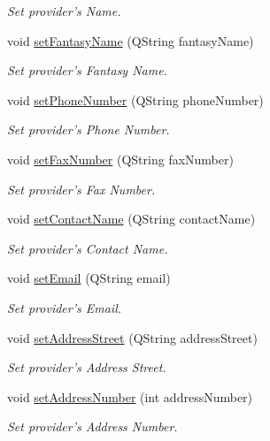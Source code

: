 \begin{DoxyCompactItemize}
\begin{DoxyCompactList}\small\item\em \-Set provider's \-Name. \end{DoxyCompactList}\item 
void \hyperlink{class_provider_a388569139fb3e2e10401d774e543739c}{set\-Fantasy\-Name} (\-Q\-String fantasy\-Name)
\begin{DoxyCompactList}\small\item\em \-Set provider's \-Fantasy \-Name. \end{DoxyCompactList}\item 
void \hyperlink{class_provider_a72039722d3095a58c8e0c2914c773bf2}{set\-Phone\-Number} (\-Q\-String phone\-Number)
\begin{DoxyCompactList}\small\item\em \-Set provider's \-Phone \-Number. \end{DoxyCompactList}\item 
void \hyperlink{class_provider_a08e25d472126d8921d33199053127231}{set\-Fax\-Number} (\-Q\-String fax\-Number)
\begin{DoxyCompactList}\small\item\em \-Set provider's \-Fax \-Number. \end{DoxyCompactList}\item 
void \hyperlink{class_provider_a3028100496ab5cd9facf37bcfe95887b}{set\-Contact\-Name} (\-Q\-String contact\-Name)
\begin{DoxyCompactList}\small\item\em \-Set provider's \-Contact \-Name. \end{DoxyCompactList}\item 
void \hyperlink{class_provider_a6e42f333b28828672781d3fdb3ce962e}{set\-Email} (\-Q\-String email)
\begin{DoxyCompactList}\small\item\em \-Set provider's \-Email. \end{DoxyCompactList}\item 
void \hyperlink{class_provider_ab4121cdd88579775564b8f32cdd895ea}{set\-Address\-Street} (\-Q\-String address\-Street)
\begin{DoxyCompactList}\small\item\em \-Set provider's \-Address \-Street. \end{DoxyCompactList}\item 
void \hyperlink{class_provider_aff6850c0a7b4fbe79e5ae22b376eb4e1}{set\-Address\-Number} (int address\-Number)
\begin{DoxyCompactList}\small\item\em \-Set provider's \-Address \-Number. \end{DoxyCompactList}\item 

\end{DoxyCompactItemize}
